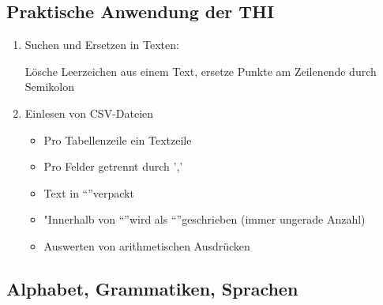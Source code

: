 \documentclass[11pt, a4paper]{article}
\begin{document}
\subsection{Praktische Anwendung der THI}

\begin{enumerate}[1)]
    \item Suchen und Ersetzen in Texten:

          Lösche Leerzeichen aus einem Text, ersetze Punkte am Zeilenende durch Semikolon
    \item Einlesen von CSV-Dateien
          \begin{itemize}[-]
              \item Pro Tabellenzeile ein Textzeile
              \item Pro Felder getrennt durch ','
              \item Text in \textquotedblleft \textquotedblright verpackt
              \item "Innerhalb von \textquotedblleft\textquotedblright wird als \textquotedblleft\textquotedblright geschrieben (immer ungerade Anzahl)
              \item Auswerten von arithmetischen Ausdrücken
          \end{itemize}
\end{enumerate}

\subsection{Alphabet, Grammatiken, Sprachen}
\end{document}
